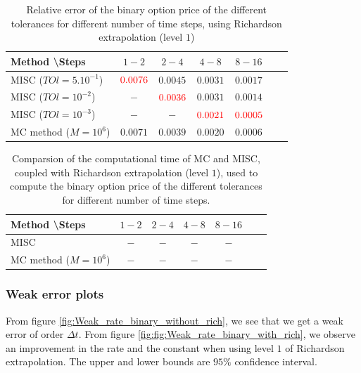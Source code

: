 \documentclass[11pt]{article}
\begin{document}
\begin{table}[h!]
	\centering
	\begin{tabular}{l*{5}{c}r}
		Method \textbackslash  Steps    &$1-2$        & $2-4$ & $4-8$ & $8-16$  \\
		\hline
		MISC ($TOl=5.10^{-1}$)  &${\color{red}0.0076}$ & $0.0045$ & $0.0031$ & $0.0017$  \\
		MISC ($TOl=10^{-2}$)  &$-$ & ${\color{red}0.0036}$ & $0.0031$ & $0.0014$  \\
		MISC ($TOl=10^{-3}$) & $-$ & $-$ & $  {\color{red}0.0021}$ & ${\color{red}0.0005}$   \\
		MC method ($M=10^{6}$)&$ \mathbf{0.0071}$    & $\mathbf{0.0039}$  & $\mathbf{0.0020}$  & $\mathbf{0.0006}$ \\
		\hline
	\end{tabular}
	\caption{Relative error of the binary option price of the different tolerances for different number of time steps, using Richardson extrapolation (level $1$)}
	\label{Relative error of binary option price of the different tolerances for different number of time steps, using Richardson extrapolation (level $1$)}
\end{table}



\begin{table}[h!]
	\centering
	\begin{tabular}{l*{5}{c}r}
		Method \textbackslash  Steps    &$1-2$        & $2-4$ & $4-8$ & $8-16$  \\
		\hline
		MISC  &$-$ & $-$ & $-$ & $-$  \\
		MC method ($M=10^{6}$)&$-$    & $-$  & $-$  & $-$ \\
		\hline
	\end{tabular}
	\caption{Comparsion of the computational time of  MC and MISC, coupled with Richardson extrapolation (level $1$), used to compute the binary option price of the different tolerances for different number of time steps.}
	\label{Comparsion of the computational time of  MC and MISC, coupled with Richardson extrapolation (level $1$), used to compute the binary option price of the different tolerances for different number of time steps}
\end{table}


\newpage
\subsubsection{Weak error plots} \label{sec:Weak error plots_binary}

From figure \ref{fig:Weak_rate_binary_without_rich}, we see that we get a weak error of order $\Delta t$. From figure \ref{fig:fig:Weak_rate_binary_with_rich}, we observe an improvement in the rate and the constant when using level $1$ of Richardson extrapolation. The upper and lower bounds are $95\%$ confidence interval.
\end{document}
